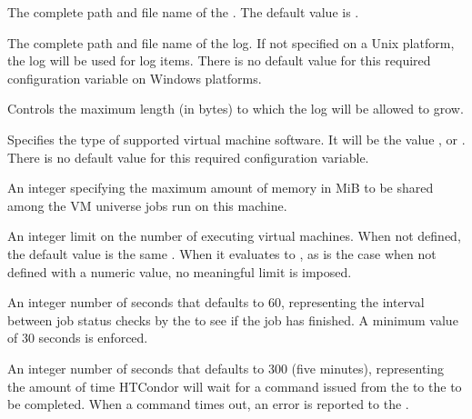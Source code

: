 \begin{description}
\label{param:VMGAHPServer}
\item[\Macro{VM\_GAHP\_SERVER}]
  The complete path and file name of the .
  The default value is .

\label{param:VMGAHPLog}
\item[\Macro{VM\_GAHP\_LOG}]
  The complete path and file name of the  log.
  If not specified on a Unix platform, the 
  log will be used for  log items. 
  There is no default value for this required configuration variable
  on Windows platforms.

\label{param:MaxVMGAHPLog}
\item[\Macro{MAX\_VM\_GAHP\_LOG}]
  Controls the maximum length (in bytes) to which the  log
  will be allowed to grow.

\label{param:VMType}
\item[\Macro{VM\_TYPE}]
  Specifies the type of supported virtual machine software.
  It will be the value \verb@kvm@, \verb@xen@ or \verb@vmware@.
  There is no default value for this required configuration variable.

\label{param:VMMemory}
\item[\Macro{VM\_MEMORY}]
  An integer specifying the maximum amount of memory in MiB
  to be shared among the VM universe jobs run on this machine.

\label{param:VMMaxNumber}
\item[\Macro{VM\_MAX\_NUMBER}]
  An integer limit on the number of executing virtual machines.
  When not defined, the default value is the same .
  When it evaluates to ,
  as is the case when not defined with a numeric value,
  no meaningful limit is imposed.

\label{param:VMStatusInterval}
\item[\Macro{VM\_STATUS\_INTERVAL}]
  An integer number of seconds that defaults to 60,
  representing the interval between job status checks by the
   to see if the job has finished.
  A minimum value of 30 seconds is enforced.

\label{param:VMGAHPReqTimeout}
\item[\Macro{VM\_GAHP\_REQ\_TIMEOUT}]
  An integer number of seconds that defaults to 300 (five minutes),
  representing the amount of time HTCondor will wait for a command issued
  from the  to the  to be completed.
  When a command times out, an error is reported to the .


\end{description}

